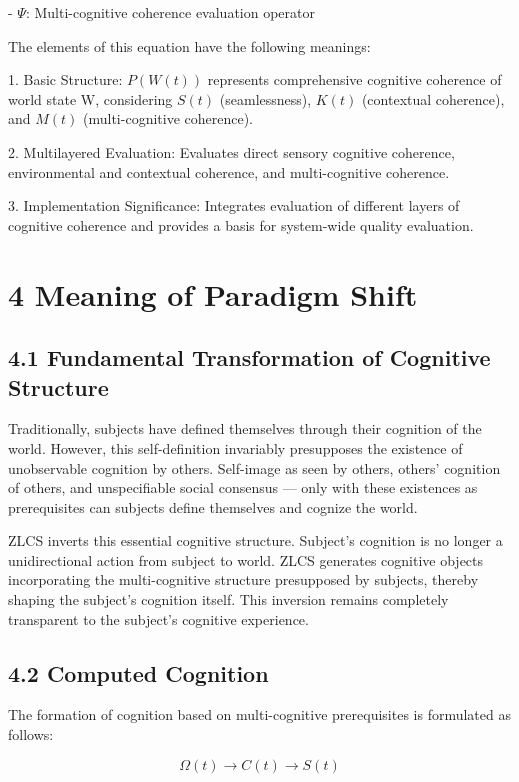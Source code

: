 \documentclass{article}
\begin{document}
- $\Psi$: Multi-cognitive coherence evaluation operator

The elements of this equation have the following meanings:

1. Basic Structure: $P(W(t))$ represents comprehensive cognitive coherence of world state W, considering $S(t)$ (seamlessness), $K(t)$ (contextual coherence), and $M(t)$ (multi-cognitive coherence).

2. Multilayered Evaluation: Evaluates direct sensory cognitive coherence, environmental and contextual coherence, and multi-cognitive coherence.

3. Implementation Significance: Integrates evaluation of different layers of cognitive coherence and provides a basis for system-wide quality evaluation.

\section{4 Meaning of Paradigm Shift}

\subsection{4.1 Fundamental Transformation of Cognitive Structure}

Traditionally, subjects have defined themselves through their cognition of the world. However, this self-definition invariably presupposes the existence of unobservable cognition by others. Self-image as seen by others, others' cognition of others, and unspecifiable social consensus — only with these existences as prerequisites can subjects define themselves and cognize the world.

ZLCS inverts this essential cognitive structure. Subject's cognition is no longer a unidirectional action from subject to world. ZLCS generates cognitive objects incorporating the multi-cognitive structure presupposed by subjects, thereby shaping the subject's cognition itself. This inversion remains completely transparent to the subject's cognitive experience.

\subsection{4.2 Computed Cognition}

The formation of cognition based on multi-cognitive prerequisites is formulated as follows:

$$
\Omega(t) \rightarrow C(t) \rightarrow S(t)
$$
\end{document}
